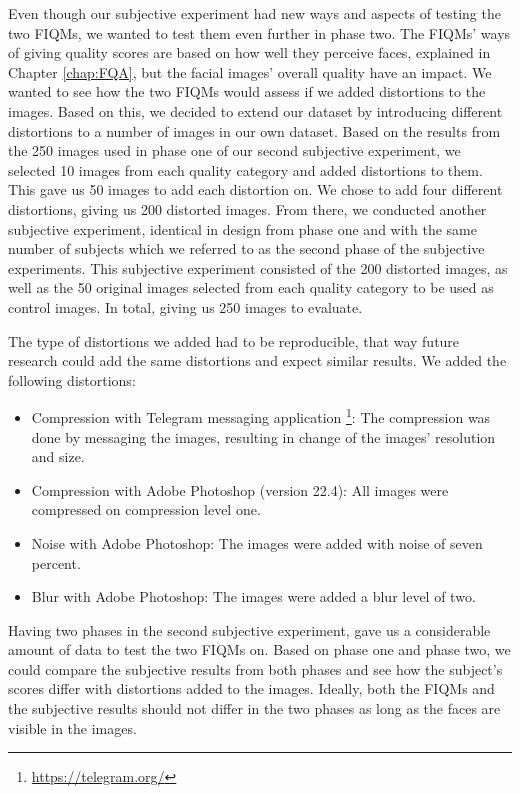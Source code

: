 Even though our subjective experiment had new ways and aspects of testing the two FIQMs, we wanted to test them even further in phase two. The FIQMs' ways of giving quality scores are based on how well they perceive faces, explained in Chapter \ref{chap:FQA}, but the facial images' overall quality have an impact. We wanted to see how the two FIQMs would assess if we added distortions to the images. Based on this, we decided to extend our dataset by introducing different distortions to a number of images in our own dataset. Based on the results from the 250 images used in phase one of our second subjective experiment, we selected 10 images from each quality category and added distortions to them. This gave us 50 images to add each distortion on. We chose to add four different distortions, giving us 200 distorted images. From there, we conducted another subjective experiment, identical in design from phase one and with the same number of subjects which we referred to as the second phase of the subjective experiments. This subjective experiment consisted of the 200 distorted images, as well as the 50 original images selected from each quality category to be used as control images. In total, giving us 250 images to evaluate.

The type of distortions we added had to be reproducible, that way future research could add the same distortions and expect similar results. We added the following distortions: 
%
\begin{itemize}
    \item Compression with Telegram messaging application \footnote{\url{https://telegram.org/}}: The compression was done by messaging the images, resulting in change of the images' resolution and size.
    \item Compression with Adobe Photoshop (version 22.4): All images were compressed on compression level one.
    \item Noise with Adobe Photoshop: The images were added with noise of seven percent. 
    \item Blur with Adobe Photoshop: The images were added a blur level of two. 
\end{itemize}
%
Having two phases in the second subjective experiment, gave us a considerable amount of data to test the two FIQMs on. Based on phase one and phase two, we could compare the subjective results from both phases and see how the subject's scores differ with distortions added to the images. Ideally, both the FIQMs and the subjective results should not differ in the two phases as long as the faces are visible in the images.


